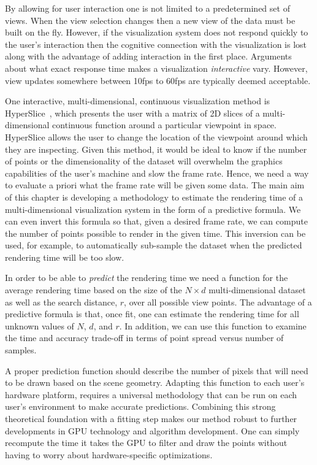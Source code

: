 By allowing for user interaction one is not limited to a
predetermined set of views.  
When the view selection changes then a new view of the data must be built
on the fly.
However, if the visualization system does not respond quickly to 
the user's interaction then the cognitive connection with the visualization
is lost~\cite{Shneiderman:1987} along with the advantage of adding 
interaction in the first place.
Arguments about what exact
response time makes a visualization \emph{interactive} vary.  However,
view updates somewhere between 10fps to 60fps are typically deemed acceptable.

One interactive, multi-dimensional, continuous
visualization method
is HyperSlice~\cite{Wijk:1993}, which presents the user
with a matrix of 2D slices of a multi-dimensional continuous function
around a particular viewpoint in space.
HyperSlice allows the user to change the
location of the viewpoint around which they are inspecting.
Given this method, it would be ideal to know if the number of
points or the dimensionality of the dataset will overwhelm the
graphics capabilities of the user's machine and slow the frame rate. 
Hence, we need a way to evaluate a priori what the frame rate will be
given some data. The main aim of this chapter is developing a methodology to 
estimate the rendering time of a multi-dimensional
visualization system in the form of a predictive formula.
We can even invert this formula so that, given a desired frame rate, 
we can compute the number of points 
possible to render in the given time.
This inversion can be used, for example, 
to automatically sub-sample the dataset when the predicted rendering 
time will be too slow.  

In order to be able to \emph{predict} the rendering time we need a
function for the average rendering time based on the size of the $N \times d$
multi-dimensional dataset as well as the search distance, $r$, over all possible view
points.  The advantage
of a predictive formula is that, once fit, one can estimate the rendering time
for all unknown values of $N$, $d$, and $r$.
In addition, we can use this function to examine the time and accuracy
trade-off in terms of point spread versus number of samples.

A proper prediction function should describe the number
of pixels that will need to be drawn based on the scene geometry.
Adapting this function
to each user's
hardware platform, requires a universal methodology that can be run on
each user's environment to make accurate predictions.
Combining this strong theoretical foundation with a fitting step makes our
method robust to further developments in GPU technology and algorithm 
development. One can simply recompute the time it takes the GPU to filter and
draw the points without having to worry about hardware-specific optimizations.


